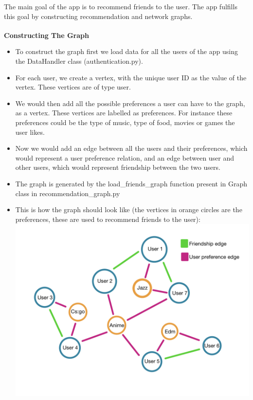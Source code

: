 \documentclass[11pt]{report}
\begin{document}
The main goal of the app is to recommend friends to the user. The app fulfills this goal by constructing recommendation and network graphs. 
~\\\\

\textbf{Constructing The Graph}

\begin{itemize}
    \item To construct the graph first we load data for all the users of the app using the DataHandler class (authentication.py). \\ 
    
    \item For each user, we create a vertex, with the unique user ID as the value of the vertex. These vertices are of type user.\\
    
    \item We would then add all the possible preferences a user can have to the graph, as a vertex. These vertices are labelled as preferences. For instance these preferences could be the type of music, type of food, movies or games the user likes.\\
    
    \item Now we would add an edge between all the users and their preferences, which would represent a user preference relation, and an edge between user and other users, which would represent friendship between the two users.  \\
    
    \item The graph is generated by the load\_friends\_graph function present in Graph class in recommendation\_graph.py \\
    
    \item This is how the graph should look like (the vertices in orange circles are the preferences, these are used to recommend friends to the user): \\
    
        \includegraphics[scale = .2]{Images/graph.jpeg}
\end{itemize}
\end{document}
